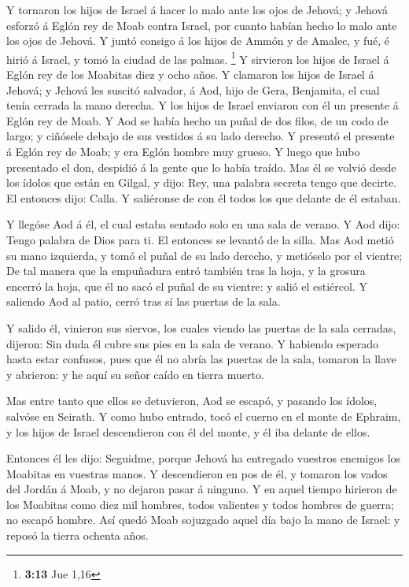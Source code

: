  Y tornaron los hijos de Israel á hacer lo malo ante los
ojos de Jehová; y Jehová esforzó á Eglón rey de Moab contra Israel, por
cuanto habían hecho lo malo ante los ojos de Jehová.  Y
juntó consigo á los hijos de Ammón y de Amalec, y fué, é hirió á Israel,
y tomó la ciudad de las palmas. \footnote{\textbf{3:13} Jue 1,16}
 Y sirvieron los hijos de Israel á Eglón rey de los
Moabitas diez y ocho años.  Y clamaron los hijos de
Israel á Jehová; y Jehová les suscitó salvador, á Aod, hijo de Gera,
Benjamita, el cual tenía cerrada la mano derecha. Y los hijos de Israel
enviaron con él un presente á Eglón rey de Moab.  Y Aod
se había hecho un puñal de dos filos, de un codo de largo; y ciñósele
debajo de sus vestidos á su lado derecho.  Y presentó el
presente á Eglón rey de Moab; y era Eglón hombre muy grueso.
 Y luego que hubo presentado el don, despidió á la gente
que lo había traído.  Mas él se volvió desde los ídolos
que están en Gilgal, y dijo: Rey, una palabra secreta tengo que decirte.
El entonces dijo: Calla. Y saliéronse de con él todos los que delante de
él estaban.

 Y llegóse Aod á él, el cual estaba sentado solo en una
sala de verano. Y Aod dijo: Tengo palabra de Dios para ti. El entonces
se levantó de la silla.  Mas Aod metió su mano izquierda,
y tomó el puñal de su lado derecho, y metióselo por el vientre;
 De tal manera que la empuñadura entró también tras la
hoja, y la grosura encerró la hoja, que él no sacó el puñal de su
vientre: y salió el estiércol.  Y saliendo Aod al patio,
cerró tras sí las puertas de la sala.

 Y salido él, vinieron sus siervos, los cuales viendo las
puertas de la sala cerradas, dijeron: Sin duda él cubre sus pies en la
sala de verano.  Y habiendo esperado hasta estar
confusos, pues que él no abría las puertas de la sala, tomaron la llave
y abrieron: y he aquí su señor caído en tierra muerto.

 Mas entre tanto que ellos se detuvieron, Aod se escapó,
y pasando los ídolos, salvóse en Seirath.  Y como hubo
entrado, tocó el cuerno en el monte de Ephraim, y los hijos de Israel
descendieron con él del monte, y él iba delante de ellos.

 Entonces él les dijo: Seguidme, porque Jehová ha
entregado vuestros enemigos los Moabitas en vuestras manos. Y
descendieron en pos de él, y tomaron los vados del Jordán á Moab, y no
dejaron pasar á ninguno.  Y en aquel tiempo hirieron de
los Moabitas como diez mil hombres, todos valientes y todos hombres de
guerra; no escapó hombre.  Así quedó Moab sojuzgado aquel
día bajo la mano de Israel: y reposó la tierra ochenta años.

